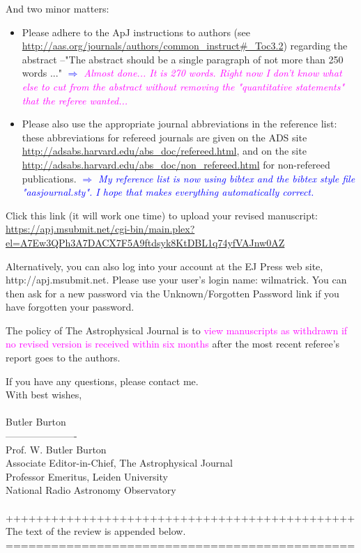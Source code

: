 \documentclass[10pt,a4paper]{article}
\newcommand{\Wilma}[1]{\textcolor{Magenta}{#1}}
\newcommand{\Comment}[1]{\textsl{\textcolor{Blue}{$\Longrightarrow$ {#1}}}}
\begin{document}
And two minor matters: 
\begin{itemize}
\item Please adhere to the ApJ instructions to authors (see \url{http://aas.org/journals/authors/common_instruct#_Toc3.2}) regarding the abstract --"The abstract should be a single paragraph of not more than 250 words ..." \Comment{\Wilma{Almost done... It is 270 words. Right now I don't know what else to cut from the abstract without removing the "quantitative statements" that the referee wanted...}}
\item Please also use the appropriate journal abbreviations in the reference list: these abbreviations for refereed journals are given on the ADS site \url{http://adsabs.harvard.edu/abs_doc/refereed.html}, and on the site
\url{http://adsabs.harvard.edu/abs_doc/non_refereed.html} for non-refereed publications. \Comment{My reference list is now using bibtex and the bibtex style file "aasjournal.sty". I hope that makes everything automatically correct.}
\end{itemize}

Click this link (it will work one time) to upload your revised manuscript:
\url{https://apj.msubmit.net/cgi-bin/main.plex?el=A7Ew3QPh3A7DACX7F5A9ftdsyk8KtDBL1q74yfVAJnw0AZ}

Alternatively, you can also log into your account at the EJ Press web site,
http://apj.msubmit.net.  Please use your user's login name: wilmatrick.  You can
then ask for a new password via the Unknown/Forgotten Password link if you have
forgotten your password. 

The policy of The Astrophysical Journal is to \Wilma{view manuscripts as withdrawn if no
revised version is received within six months} after the most recent referee's report
goes to the authors.

If you have any questions, please contact me.\\


With best wishes,\\\\
Butler Burton\\
----------------------\\
Prof. W. Butler Burton\\
Associate Editor-in-Chief, The Astrophysical Journal\\
Professor Emeritus, Leiden University\\
National Radio Astronomy Observatory\\
\\++++++++++++++++++++++++++++++++++++++++++++++\\
The text of the review is appended below.\\
==============================================\\\\ 
  
\end{document}
